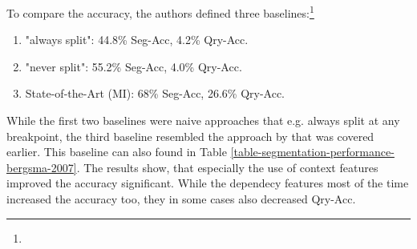 

To compare the accuracy, the authors defined three baselines:\footnote{}
\begin{enumerate}
\item[1)] "always split": 44.8\% Seg-Acc, 4.2\% Qry-Acc.
\item[2)] "never split": 55.2\% Seg-Acc, 4.0\% Qry-Acc.
\item[3)] State-of-the-Art (MI): 68\% Seg-Acc, 26.6\% Qry-Acc.
\end{enumerate}
While the first two baselines were naive approaches that e.g. always split at any breakpoint, the third baseline resembled the approach by \citeauthor{Risvik:2003} that was covered earlier. This baseline can also found in Table \ref{table-segmentation-performance-bergsma-2007}. The results show, that especially the use of context features improved the accuracy significant. While the dependecy features most of the time increased the accuracy too, they in some cases also decreased Qry-Acc.